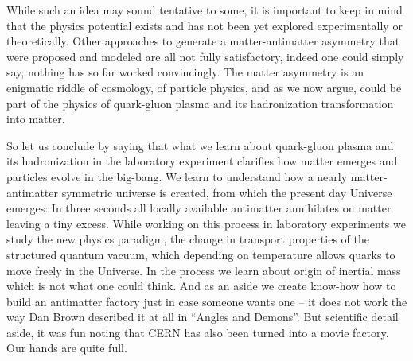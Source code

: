 \documentclass[twocolumn,showdate,prd,aps]{revtex4}
\begin{document}
While such an idea may sound tentative to some,  it is important to keep in mind that the physics potential exists and has not been yet explored experimentally or theoretically. Other approaches to generate a matter-antimatter asymmetry that   were proposed and modeled are all not fully satisfactory, indeed one could simply say, nothing has so far worked convincingly. The matter asymmetry is an enigmatic riddle of cosmology, of particle physics, and as we now argue, could be part of the physics of quark-gluon plasma and its hadronization transformation into matter. 

So let us conclude by saying  that what we learn about quark-gluon plasma and its hadronization in the laboratory experiment clarifies how matter emerges and particles evolve in the big-bang. We learn to understand how a nearly matter-antimatter symmetric universe is created, from which the present day Universe emerges: In three seconds  all locally available antimatter  annihilates on matter leaving a tiny excess.   While working on this process in laboratory experiments we study the  new physics paradigm, the change in transport properties of the structured quantum vacuum, which depending on temperature allows quarks to move freely in the Universe. In the process we learn about origin of inertial mass which is not what one could think. And as an aside we create know-how how to build an antimatter factory just in case someone wants one -- it does not work the way Dan Brown described it at all in ``Angles and Demons''. But  scientific detail aside, it was fun noting that CERN has also been turned into a movie factory.  Our hands are quite full. 
\end{document}
